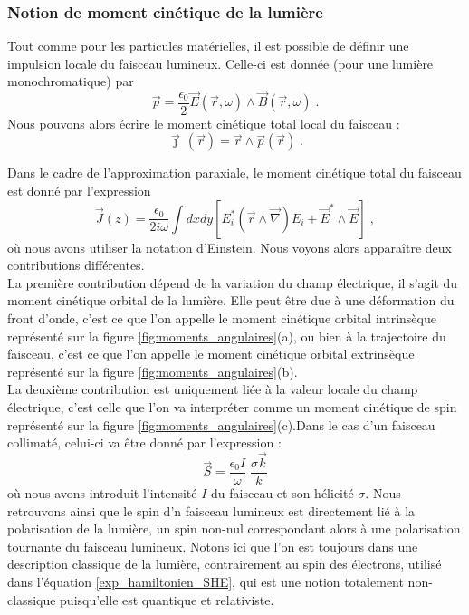 \documentclass[a4paper,11pt]{article} %
\begin{document}
	\subsubsection{Notion de moment cinétique de la lumière}
	Tout comme pour les particules matérielles, il est possible de définir une impulsion locale du faisceau lumineux. Celle-ci est donnée (pour une lumière monochromatique) par 
	\begin{equation*}
		\vec{p} = \frac{\epsilon_0}{2} \vec{E}(\vec{r}, \omega) \wedge \vec{B}(\vec{r}, \omega) \; .
	\end{equation*}
	Nous pouvons alors écrire le moment cinétique total local du faisceau :
	\begin{equation*}
		\vec{\jmath} \, (\vec{r}) = \vec{r} \wedge \vec{p}(\vec{r}) \; .
	\end{equation*}
	
	Dans le cadre de l'approximation paraxiale, le moment cinétique total du faisceau est donné par l'expression
	\begin{equation}
		\vec{J}(z) = \frac{\epsilon_0}{2 i \omega} \int dx dy \left[ E_i^* (\vec{r} \wedge \vec{\nabla}) E_i + \vec{E}^* \wedge \vec{E} \right] \; ,
	\end{equation}
	où nous avons utiliser la notation d'Einstein. Nous voyons alors apparaître deux contributions différentes.\\
	
	La première contribution dépend de la variation du champ électrique, il s'agit du moment cinétique orbital de la lumière. Elle peut être due à une déformation du front d'onde, c'est ce que l'on appelle le moment cinétique orbital intrinsèque représenté sur la figure \ref{fig:moments_angulaires}(a), ou bien à la trajectoire du faisceau, c'est ce que l'on appelle le moment cinétique orbital extrinsèque représenté sur la figure \ref{fig:moments_angulaires}(b).\\	
	
	La deuxième contribution est uniquement liée à la valeur locale du champ électrique, c'est celle que l'on va interpréter comme un moment cinétique de spin représenté sur la figure \ref{fig:moments_angulaires}(c).Dans le cas d'un faisceau collimaté, celui-ci va être donné par l'expression :
		\begin{equation*}
			\vec{S} = \frac{\epsilon_0 I}{\omega} \; \frac{\sigma \vec{k}}{k}
		\end{equation*}
	où nous avons introduit l'intensité $ I $ du faisceau et son hélicité $ \sigma $. Nous retrouvons ainsi que le spin d'n faisceau lumineux est directement lié à la polarisation de la lumière, un spin non-nul correspondant alors à une polarisation tournante du faisceau lumineux. Notons ici que l'on est toujours dans une description classique de la lumière, contrairement au spin des électrons, utilisé dans l'équation \eqref{exp_hamiltonien_SHE}, qui est une notion totalement non-classique puisqu'elle est quantique et relativiste.	
	
\end{document}

